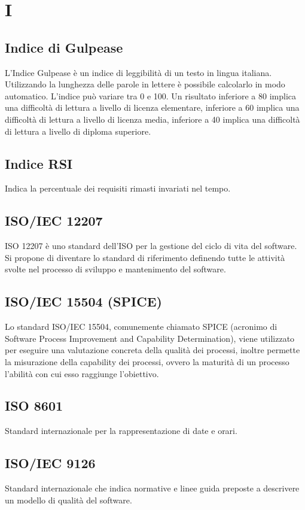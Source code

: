 {	\section{I}
	\subsection{Indice di Gulpease}
	L'Indice Gulpease è un indice di leggibilità di un testo in lingua italiana. Utilizzando la lunghezza delle parole in lettere è possibile calcolarlo in modo automatico. L'indice può variare tra 0 e 100. Un risultato inferiore a 80 implica una difficoltà di lettura a livello di licenza elementare, inferiore a 60 implica una difficoltà di lettura a livello di licenza media, inferiore a 40 implica una difficoltà di lettura a livello di diploma superiore.
	\subsection{Indice RSI}
	Indica la percentuale dei requisiti rimasti invariati nel tempo.
	
	\subsection{ISO/IEC 12207}
		ISO 12207 è uno standard dell'ISO per la gestione del ciclo di vita del software. Si propone di diventare lo standard di riferimento definendo tutte le attività svolte nel processo di sviluppo e mantenimento del software.
		
	\subsection{ISO/IEC 15504 (SPICE)}
	Lo standard ISO/IEC 15504, comunemente chiamato SPICE (acronimo di Software Process Improvement and Capability Determination), viene utilizzato per eseguire una valutazione concreta della qualità dei processi, inoltre permette la misurazione della capability dei processi, ovvero la maturità
	di un processo l’abilità con cui esso raggiunge l’obiettivo.

	\subsection{ISO 8601}
	Standard internazionale per la rappresentazione di date e orari.
	
	\subsection{ISO/IEC 9126}
	Standard internazionale che indica normative e linee guida preposte a descrivere un modello di qualità del software.
	
}
